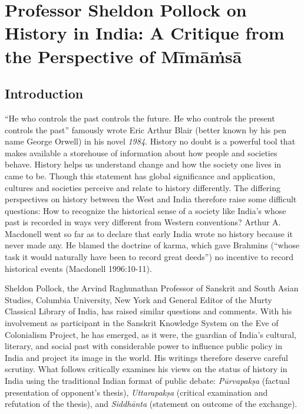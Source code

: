 
\chapter{Professor Sheldon Pollock on History in India: A Critique from the Perspective of Mīmāṁsā}



\section*{Introduction}

“He who controls the past controls the future. He who controls the present controls the past” famously wrote Eric Arthur Blair (better known by his pen name George Orwell) in his novel \textit{1984}. History no doubt is a powerful tool that makes available a storehouse of information about how people and societies behave. History helps us understand change and how the society one lives in came to be. Though this statement has global significance and application, cultures and societies perceive and relate to history differently. The differing perspectives on history between the West and India therefore raise some difficult questions: How to recognize the historical sense of a society like India’s whose past is recorded in ways very different from Western conventions? Arthur A. Macdonell went so far as to declare that early India wrote no history because it never made any. He blamed the doctrine of karma, which gave Brahmins (“whose task it would naturally have been to record great deeds”) no incentive to record historical events (Macdonell 1996:10-11).

\newpage

Sheldon Pollock, the Arvind Raghunathan Professor of Sanskrit and South Asian Studies, Columbia University, New York and General Editor of the Murty Classical Library of India, has raised similar questions and comments. With his involvement as participant in the Sanskrit Knowledge System on the Eve of Colonialism Project, he has emerged, as it were, the guardian of India’s cultural, literary, and social past with considerable power to influence public policy in India and project its image in the world. His writings therefore deserve careful scrutiny. What follows critically examines his views on the status of history in India using the traditional Indian format of public debate: \textit{Pūrvapakṣa} (factual presentation of opponent’s thesis), \textit{Uttarapakṣa} (critical examination and refutation of the thesis), and \textit{Siddhānta} (statement on outcome of the exchange).


